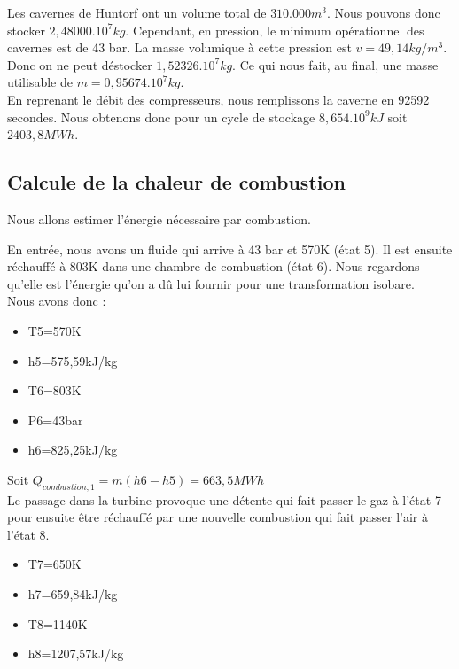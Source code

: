 Les cavernes de Huntorf ont un volume total de $310.000 m^{3}$. Nous pouvons donc stocker $2,48000.10^{7} kg$. Cependant, en pression, le minimum opérationnel des cavernes est de 43 bar. La masse volumique à cette pression est $v=49,14kg/m^{3}$. Donc on ne peut déstocker $1,52326.10^{7} kg$. Ce qui nous fait, au final, une masse utilisable de $m=0,95674.10^{7} kg$. \\

En reprenant le débit des compresseurs, nous remplissons la caverne en 92592 secondes. Nous obtenons donc pour un cycle de stockage $8,654.10^{9} kJ$ soit $2403,8 MWh$.\\
\newpage

\subsection{Calcule de la chaleur de combustion}

Nous allons estimer l'énergie nécessaire par combustion.

En entrée, nous avons un fluide qui arrive à 43 bar et 570K (état 5). Il est ensuite réchauffé à 803K dans une chambre de combustion (état 6). Nous regardons qu'elle est l'énergie qu'on a dû lui fournir pour une transformation isobare. \\


Nous avons donc :

\begin{itemize}
\item T5=570K
\item h5=575,59kJ/kg\\

\item T6=803K
\item P6=43bar
\item h6=825,25kJ/kg\\

\end{itemize}

Soit $Q_{combustion,1}=m(h6-h5)=663,5MWh$\\


Le passage dans la turbine provoque une détente qui fait passer le gaz à l'état 7 pour ensuite être réchauffé par une nouvelle combustion qui fait passer l'air à l'état 8.

\begin{itemize}
\item T7=650K
\item h7=659,84kJ/kg\\

\item T8=1140K
\item h8=1207,57kJ/kg\\

\end{itemize}

